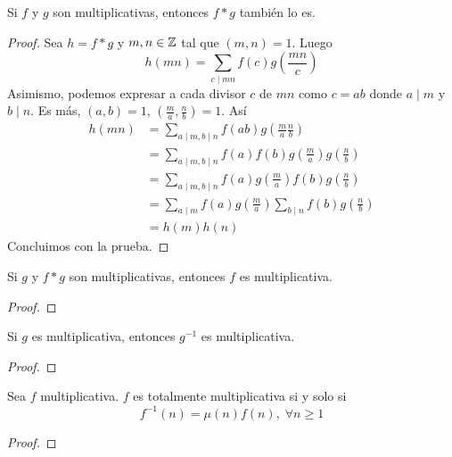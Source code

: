 \documentclass[main.tex]{subfiles}
\begin{document}
\begin{theorem}
Si $f$ y $g$ son multiplicativas, entonces $f*g$ tambi\'en lo es.
\end{theorem}
\begin{proof}
Sea $h = f*g$ y $m, n \in \mathbb Z$ tal que $(m, n) = 1$. Luego
$$h(mn) = \sum_{c \mid mn} f(c)g(\frac{mn}{c})$$
Asimismo, podemos expresar a cada divisor $c$ de $mn$ como $c = ab$ donde $a \mid m$ y $b \mid n$. Es m\'as, $(a, b) = 1$, $(\frac{m}{a}, \frac{n}{b}) = 1$. As\'i
\begin{align*}
    h(mn) &= \sum_{a \mid m, b \mid n} f(ab)g(\frac{m}{a}\frac{n}{b})\\
    &= \sum_{a \mid m, b \mid n} f(a)f(b)g(\frac{m}{a})g(\frac{n}{b})\\
    &= \sum_{a \mid m, b \mid n} f(a)g(\frac{m}{a})f(b)g(\frac{n}{b})\\
    &= \sum_{a \mid m}f(a)g(\frac{m}{a})\sum_{b \mid n}f(b)g(\frac{n}{b})\\
    &= h(m)h(n)
\end{align*}
Concluimos con la prueba.
\end{proof}
\begin{theorem}
Si $g$ y $f*g$ son multiplicativas, entonces $f$ es multiplicativa.
\end{theorem}
\begin{proof}
\end{proof}
\begin{theorem}
Si $g$ es multiplicativa, entonces $g^{-1}$ es multiplicativa.
\end{theorem}
\begin{proof}
\end{proof}
\begin{theorem}
Sea $f$ multiplicativa. $f$ es totalmente multiplicativa si y solo si
$$f^{-1}(n) = \mu(n)f(n),\;\forall n \geq 1$$
\end{theorem}
\begin{proof}
\end{proof}
\end{document}

